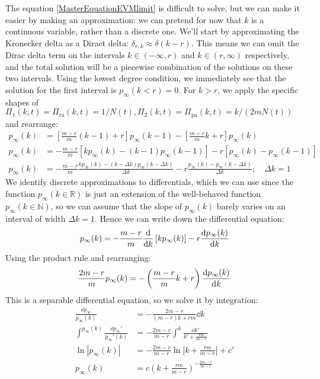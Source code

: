 \documentclass[a4paper,12pt]{article}
\begin{document}
The equation \ref{MasterEquationEVMlimit} is difficult to solve, but we can make it easier by making an approximation: we can pretend for now that $k$ is a continuous variable, rather than a discrete one. We'll start by approximating the Kronecker delta as a Diract delta: $\delta_{r,k}\approx \delta(k-r)$. This means we can omit the Dirac delta term on the intervals $k\in (-\infty,r)$ and $k\in (r,\infty)$ respectively, and the total solution will be a piecewise combination of the solutions on these two intervals. Using the lowest degree condition, we immediately see that the solution for the first interval is $p_\infty(k<r)=0$. For $k>r$, we apply the specific shapes of $\Pi_1(k,t)=\Pi_{\mathrm{ra}}(k,t)=1/N(t),\Pi_2(k,t)=\Pi_{\mathrm{pa}}(k,t)=k/(2mN(t))$ and rearrange:
\begin{align*}
p_\infty(k)&=\left[\frac{m-r}{m}(k-1)+r\right]p_\infty(k-1)-\left[\frac{m-r}{m}k+r\right]p_\infty(k)\\
p_\infty(k)&= -\frac{m-r}{m}\left[kp_\infty(k)-(k-1)p_\infty(k-1)\right]-r\left[p_\infty(k)-p_\infty(k-1)\right]\\
p_\infty(k)&= -\frac{m-r}{m}\frac{kp_\infty(k)-(k-\Delta k)p_\infty(k-\Delta k)}{\Delta k}-r\frac{p_\infty(k)-p_\infty(k-\Delta k)}{\Delta k};\quad\Delta k=1
\end{align*}
We identify discrete approximations to differentials, which we can use since the function $p_\infty(k\in\mathbb{R})$ is just an extension of the well-behaved function $p_\infty(k\in\mathbb{N})$, so we can assume that the slope of $p_\infty(k)$ barely varies on an interval of width $\Delta k=1$. Hence we can write down the differential equation:
\begin{equation} \label{MasterEquationEVMdiff}
p_\infty(k)=-\frac{m-r}{m}\dv{k}\left[kp_\infty(k)\right]-r\dv{p_\infty(k)}{k}
\end{equation}
Using the product rule and rearranging:
\begin{equation*}
\frac{2m-r}{m}p_\infty(k)=-\left(\frac{m-r}{m}k+r\right)\dv{p_\infty(k)}{k}
\end{equation*}
This is a separable differential equation, so we solve it by integration:
\begin{align*}
\frac{\dd{p_\infty}}{p_\infty(k)}&=-\frac{2m-r}{(m-r)k+rm}\dd{k}\\
\int^{p_\infty(k)}\frac{\dd{p_\infty'}}{p_\infty'(k)}&= -\frac{2m-r}{m-r}\int^k \frac{\dd{k'}}{k'+\frac{rm}{m-r}}\\
\ln|p_\infty(k)|&= -\frac{2m-r}{m-r}\ln\left|k+\frac{rm}{m-r}\right|+c'\\
p_\infty(k) &= c\left(k+\frac{rm}{m-r}\right)^{-\frac{2m-r}{m-r}}
\end{align*}
\end{document}

